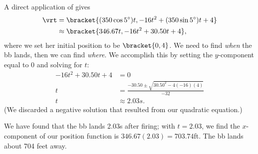 {A direct application of  gives
\begin{align*}
\vrt &=\bracket{(350\cos 5^\circ)t, -16t^2 + (350\sin 5^\circ)t + 4}\\
&\approx\bracket{346.67t, -16t^2+30.50t+4},
\end{align*}
where we set her initial position to be $\bracket{0,4}$.
We need to find \emph{when} the bb lands, then we can find \emph{where}. We accomplish this by setting the $y$-component equal to 0 and solving for $t$:
\begin{align*}
-16t^2+30.50t+4 &= 0 \\
t &= \frac{-30.50 \pm \sqrt{30.50^2-4(-16)(4)}}{-32}\\
t &\approx 2.03s.
\end{align*}
(We discarded a negative solution that resulted from our quadratic equation.) 

We have found that the bb lands 2.03s after firing; with $t=2.03$, we find the $x$-component of our position function is $346.67(2.03) = 703.74$ft. The bb lands about 704 feet away.}

